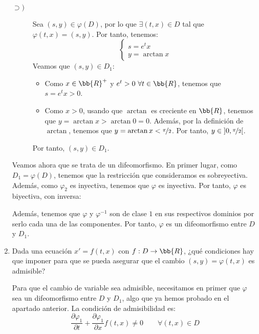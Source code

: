 \documentclass[12pt]{article}
\begin{document}
\begin{ejercicio}
\begin{enumerate}
\begin{description}
                \item[$\supset)$] Sea $(s,y)\in \varphi(D)$, por lo que $\exists (t,x)\in D$ tal que $\varphi(t,x)=(s,y)$. Por tanto, tenemos:
                \begin{equation*}
                    \left\{
                        \begin{aligned}
                            s=e^tx\\
                            y=\arctan x
                        \end{aligned}
                    \right.
                \end{equation*}
                Veamos que $(s,y)\in D_1$:
                \begin{itemize}
                    \item Como $x\in \bb{R}^+$ y $e^t>0~\forall t\in\bb{R}$, tenemos que $s=e^tx>0$.
                    \item Como $x>0$, usando que $\arctan$ es creciente en $\bb{R}$, tenemos que $y=\arctan x>\arctan 0=0$. Además, por la definición de $\arctan$, tenemos que $y=\arctan x<\nicefrac{\pi}{2}$. Por tanto, $y\in\left]0,\nicefrac{\pi}{2}\right[$.
                \end{itemize}
                Por tanto, $(s,y)\in D_1$.
            \end{description}

            Veamos ahora que se trata de un difeomorfismo. En primer lugar, como $D_1=\varphi(D)$, tenemos que la restricción que consideramos es sobreyectiva. Además, como $\varphi_2$ es inyectiva, tenemos que $\varphi$ es inyectiva. Por tanto, $\varphi$ es biyectiva, con inversa:

            Además, tenemos que $\varphi$ y $\varphi^{-1}$ son de clase $1$ en sus respectivos dominios por serlo cada una de las componentes. Por tanto, $\varphi$ es un difeomorfismo entre $D$ y $D_1$.

            \item Dada una ecuación $x' = f(t, x)$ con $f : D \to \bb{R}$, ¿qué condiciones hay que imponer para que se pueda asegurar que el cambio $(s, y) = \varphi(t, x)$ es admisible?
            
            Para que el cambio de variable sea admisible, necesitamos en primer que $\varphi$ sea un difeomorfismo entre $D$ y $D_1$, algo que ya hemos probado en el apartado anterior. La condición de admisibilidad es:
            \begin{equation*}
                \dfrac{\partial \varphi_1}{\partial t}+\dfrac{\partial \varphi_1}{\partial x}f(t,x)\neq 0\qquad \forall (t,x)\in D
            \end{equation*}


\end{enumerate}
\end{ejercicio}
\end{document}
